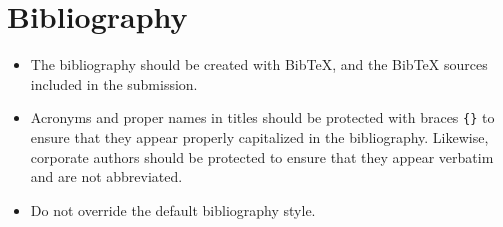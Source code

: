\documentclass[11pt]{article}
\begin{document}
\section*{Bibliography}

\begin{itemize}
\item The bibliography should be created with BibTeX, and the BibTeX
  sources included in the submission.
\item Acronyms and proper names in titles should be protected with
  braces \verb+{}+ to ensure that they appear properly capitalized
  in the bibliography. Likewise, corporate authors should be
  protected to ensure that they appear verbatim and are not abbreviated.
\item Do not override the default bibliography style.
\end{itemize}
\end{document}
